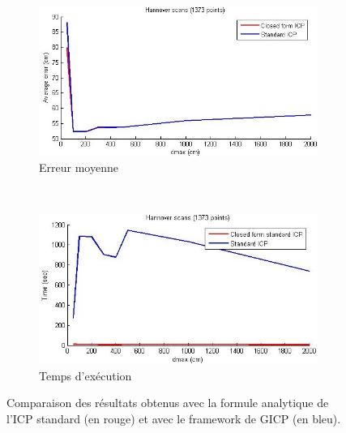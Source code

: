 \begin{figure}[!h]
   \centering
   \begin{subfigure}[t]{.5\linewidth}
     \centering
     \includegraphics[scale=0.4]{Images/Resultats/hannover_diff_ICP_closed_form_dmax.jpg}
     \caption{Erreur moyenne}
   \end{subfigure}%
   ~
   \begin{subfigure}[t]{.5\linewidth}
     \centering
     \includegraphics[scale=0.4]{Images/Resultats/hannover_diff_time_ICP_closed_form_dmax.jpg}
     \caption{Temps d'exécution}
   \end{subfigure}
   
   \caption{Comparaison des résultats obtenus avec la formule analytique de l'ICP standard (en rouge) et avec le framework de GICP (en bleu).}
   \label{fig:closedform_ICP}
\end{figure}